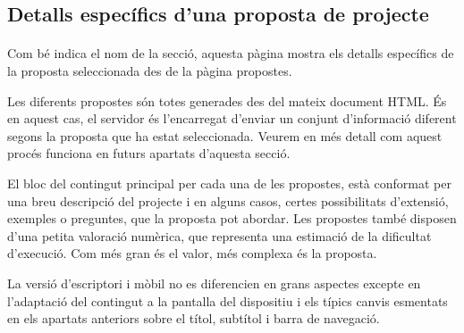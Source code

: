 \subsection{Detalls específics d'una proposta de projecte}

    \paragraph{}
    Com bé indica el nom de la secció, aquesta pàgina mostra els detalls específics de la proposta seleccionada des de la pàgina propostes.

    Les diferents propostes són totes generades des del mateix document HTML. És en aquest cas, el servidor és l'encarregat d'enviar un conjunt d'informació diferent segons la proposta que ha estat seleccionada. Veurem en més detall com aquest procés funciona en futurs apartats d’aquesta secció.

    El bloc del contingut principal per cada una de les propostes, està conformat per una breu descripció del projecte i en alguns casos, certes possibilitats d'extensió, exem\-ples o preguntes, que la proposta pot abordar. Les propostes també disposen d’una petita valoració numèrica, que representa una estimació de la dificultat d’execució. Com més gran és el valor, més complexa és la proposta.

    La versió d'escriptori i mòbil no es diferencien en grans aspectes excepte en l'adaptació del contingut a la pantalla del dispositiu i els típics canvis esmentats en els apartats anteriors sobre el títol, subtítol i barra de navegació.
